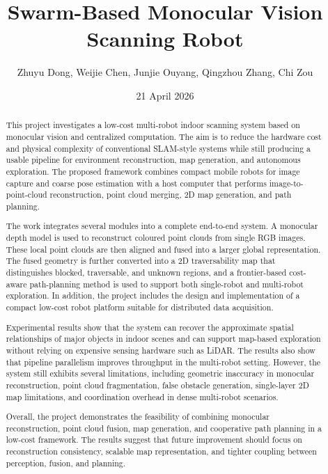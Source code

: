 \documentclass[12pt]{interim_report}
\title{Swarm-Based Monocular Vision Scanning Robot}
\author{Zhuyu Dong, Weijie Chen, Junjie Ouyang, Qingzhou Zhang, Chi Zou}
\date{21 April 2026}
\begin{document}
\coverpage
\declaration
\maketitle
\tableofcontents

\begin{abstract}
This project investigates a low-cost multi-robot indoor scanning system based on monocular vision and centralized computation. The aim is to reduce the hardware cost and physical complexity of conventional SLAM-style systems while still producing a usable pipeline for environment reconstruction, map generation, and autonomous exploration. The proposed framework combines compact mobile robots for image capture and coarse pose estimation with a host computer that performs image-to-point-cloud reconstruction, point cloud merging, 2D map generation, and path planning.

The work integrates several modules into a complete end-to-end system. A monocular depth model is used to reconstruct coloured point clouds from single RGB images. These local point clouds are then aligned and fused into a larger global representation. The fused geometry is further converted into a 2D traversability map that distinguishes blocked, traversable, and unknown regions, and a frontier-based cost-aware path-planning method is used to support both single-robot and multi-robot exploration. In addition, the project includes the design and implementation of a compact low-cost robot platform suitable for distributed data acquisition.

Experimental results show that the system can recover the approximate spatial relationships of major objects in indoor scenes and can support map-based exploration without relying on expensive sensing hardware such as LiDAR. The results also show that pipeline parallelism improves throughput in the multi-robot setting. However, the system still exhibits several limitations, including geometric inaccuracy in monocular reconstruction, point cloud fragmentation, false obstacle generation, single-layer 2D map limitations, and coordination overhead in dense multi-robot scenarios.

Overall, the project demonstrates the feasibility of combining monocular reconstruction, point cloud fusion, map generation, and cooperative path planning in a low-cost framework. The results suggest that future improvement should focus on reconstruction consistency, scalable map representation, and tighter coupling between perception, fusion, and planning.
\end{abstract}
\end{document}

